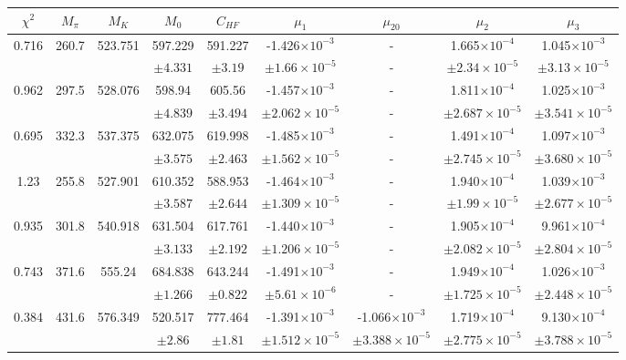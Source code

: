 \documentclass[10pt,a4paper]{article}
\begin{document}
					\begin{table}[h!]
						\begin{tabular}{ccccccccc}
							$\chi^2$ & $M_\pi$ & $M_K$ & $M_0$ & $C_{HF}$ & $\mu_1$ & $\mu_{20}$ & $\mu_2$ & $\mu_3$ \\
							\hline 0.716 & 260.7 & 523.751 & 597.229 & 591.227 & -1.426$\times10^{-3}$ &  - & 1.665$\times10^{-4}$ & 1.045$\times10^{-3}$ \\
							 &&& $\pm4.331$ & $\pm3.19$ & $\pm1.66\times10^{-5}$& - & $\pm2.34\times10^{-5}$& $\pm3.13\times10^{-5}$  \\
							\hline 0.962 & 297.5 & 528.076 & 598.94 & 605.56 & -1.457$\times10^{-3}$ & - & 1.811$\times10^{-4}$ & 1.025$\times10^{-3}$  \\
							&&& $\pm4.839$& $\pm3.494$& $\pm2.062\times10^{-5}$& - & $\pm2.687\times10^{-5}$ & $\pm3.541\times10^{-5}$  \\
							\hline 0.695 & 332.3 & 537.375 & 632.075 & 619.998 & -1.485$\times10^{-3}$ & - & 1.491$\times10^{-4}$ & 1.097$\times10^{-3}$ \\
							&&& $\pm3.575$ & $\pm2.463$ & $\pm1.562\times10^{-5}$  & - & $\pm2.745\times10^{-5}$ & $\pm3.680\times10^{-5}$ \\
							\hline 1.23 & 255.8 & 527.901 & 610.352 & 588.953 & -1.464$\times10^{-3}$ & - & 1.940$\times10^{-4}$ & 1.039$\times10^{-3}$ \\
							&&& $\pm3.587$ & $\pm2.644$ & $\pm1.309\times10^{-5}$  & - &  $\pm1.99\times10^{-5}$ & $\pm2.677\times10^{-5}$   \\
							\hline 0.935 & 301.8 & 540.918 & 631.504 & 617.761 & -1.440$\times10^{-3}$ & - &  1.905$\times10^{-4}$ & 9.961$\times10^{-4}$ \\
							&&& $\pm3.133$ & $\pm2.192$ & $\pm1.206\times10^{-5}$ & - & $\pm2.082\times10^{-5}$ &  $\pm2.804\times10^{-5}$  \\
							\hline 0.743 & 371.6 & 555.24 & 684.838 & 643.244 & -1.491$\times10^{-3}$ & - & 1.949$\times10^{-4}$ & 1.026$\times10^{-3}$ \\
							&&& $\pm1.266$& $\pm0.822$ & $\pm5.61\times10^{-6}$ & - & $\pm1.725\times10^{-5}$ & $\pm2.448\times10^{-5}$  \\
							\hline 0.384 & 431.6 & 576.349 & 520.517 & 777.464 & -1.391$\times10^{-3}$ & -1.066$\times10^{-3}$ & 1.719$\times10^{-4}$ & 9.130$\times10^{-4}$ \\
							&&& $\pm2.86$  & $\pm1.81$ & $\pm1.512\times10^{-5}$& $\pm3.388\times10^{-5}$ & $\pm2.775\times10^{-5}$&  $\pm3.788\times10^{-5}$   \\

\end{tabular}
\end{table}
\end{document}
